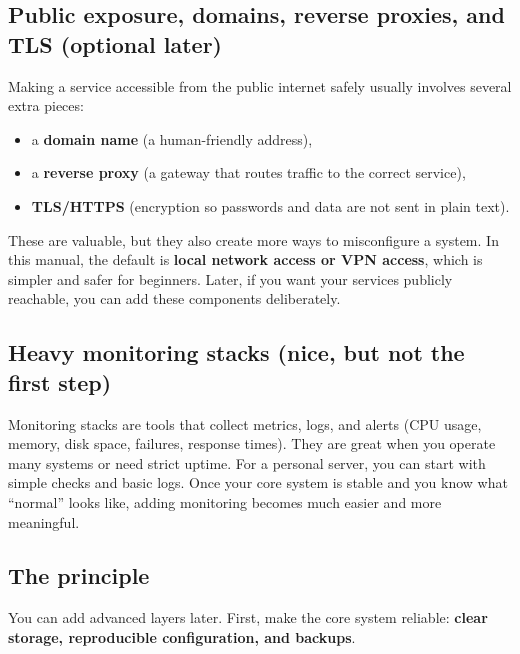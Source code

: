 \subsection*{Public exposure, domains, reverse proxies, and TLS (optional later)}
Making a service accessible from the public internet safely usually involves several extra pieces:
\begin{itemize}[leftmargin=*]
  \item a \textbf{domain name} (a human-friendly address),
  \item a \textbf{reverse proxy} (a gateway that routes traffic to the correct service),
  \item \textbf{TLS/HTTPS} (encryption so passwords and data are not sent in plain text).
\end{itemize}

These are valuable, but they also create more ways to misconfigure a system.
In this manual, the default is \textbf{local network access or VPN access}, which is simpler and safer for beginners.
Later, if you want your services publicly reachable, you can add these components deliberately.

\subsection*{Heavy monitoring stacks (nice, but not the first step)}
Monitoring stacks are tools that collect metrics, logs, and alerts (CPU usage, memory, disk space, failures, response times).
They are great when you operate many systems or need strict uptime.
For a personal server, you can start with simple checks and basic logs.
Once your core system is stable and you know what ``normal'' looks like, adding monitoring becomes much easier and more meaningful.

\subsection*{The principle}
You can add advanced layers later.
First, make the core system reliable: \textbf{clear storage, reproducible configuration, and backups}. 